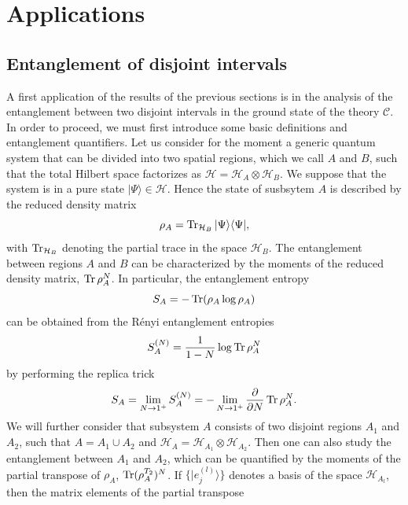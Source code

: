 \documentclass[a4paper,11pt]{article}
\def\Tr{\mathop{\mbox{\normalfont Tr}}\nolimits}
\begin{document}
\section{Applications}\label{sec:num_bootstrap}

\subsection{Entanglement of disjoint intervals}

A first application of the results of the previous sections is in 
the analysis of the entanglement between two disjoint intervals in the ground 
state of the theory $\mathcal{C}$. In order to proceed, we must first introduce some basic 
definitions and entanglement quantifiers. Let us consider for the moment a generic quantum 
system that can be divided into two spatial regions, which we call $A$ and $B$, 
such that the total Hilbert space factorizes as $\mathcal{H}=\mathcal{H}_A\otimes \mathcal{H}_B$.
We suppose that the system is in a pure state $|\Psi\rangle\in\mathcal{H}$. 
Hence the state of susbsytem $A$ is described by the reduced density matrix
\begin{equation}
\rho_A=\Tr_{\mathcal{H}_B}|\Psi\rangle\langle\Psi|,
\end{equation}
with $\Tr_{\mathcal{H}_B}$ denoting the partial trace in the space $\mathcal{H}_B$. 
The entanglement between regions $A$ and $B$ can be characterized by the moments of the 
reduced density matrix, $\Tr\rho_A^N$. In particular, the entanglement entropy 
\begin{equation}
 S_A=-\Tr(\rho_A\log \rho_A)
\end{equation}
can be obtained from the R\'enyi entanglement entropies 
\begin{equation}
 S_A^{(N)}=\frac{1}{1-N}\log\Tr\rho_A^N
\end{equation}
by performing the replica trick
\begin{equation}
 S_A=\lim_{N\to 1^+}S_A^{(N)}=-\lim_{N\to1^+}\frac{\partial}{\partial N}\Tr\rho_A^N.
\end{equation}
We will further consider that subsystem $A$ consists of two disjoint regions $A_1$ and $A_2$, 
such that $A=A_1\cup A_2$ and $\mathcal{H}_A=\mathcal{H}_{A_1}\otimes\mathcal{H}_{A_2}$. 
Then one can also study the entanglement between $A_1$ and $A_2$, which can be quantified by 
the moments of the partial transpose of $\rho_A$, $\Tr(\rho_A^{T_2})^N$. If $\{|e_j^{(l)}\rangle\}$
denotes a basis of the space $\mathcal{H}_{A_l}$, then the matrix elements of the partial transpose 
\end{document}
